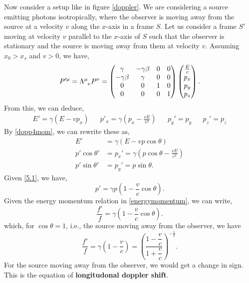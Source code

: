 \documentclass{book}
\begin{document}
Now consider a setup like in figure \ref{doppler}. We are considering a source emitting photons isotropically, where the observer is moving away from the source at a velocity $v$ along the $x$-axis in a frame $S$. Let us consider a frame $S'$ moving at velocity $v$ parallel to the $x$-axis of $S$ such that the observer is stationary and the source is moving away from them at velocity $v$. Assuming $x_0 > x_s$ and $v>0$, we have,
\begin{equation}
	P'^{\mu} = \Lambda\indices{^\mu_\nu}P^{\nu} = \begin{pmatrix}
		\gamma & -\gamma\beta & 0 & 0 \\
		-\gamma\beta & \gamma & 0 & 0 \\
		0 & 0 & 1 & 0 \\
		0 & 0 & 0 & 1
	\end{pmatrix}\begin{pmatrix}
	\frac{E}{c} \\ p_x \\ p_y \\ p_z
	\end{pmatrix}.
\end{equation}
From this, we can deduce,
\begin{align}
	E' = \gamma\left(E - vp_x\right) && p'_x = \gamma\left(p_x - \frac{vE}{c^2}\right) && p_y' =p_y && p_z' = p_z
\end{align}
By \eqref{dopp4mom}, we can rewrite these as,
\begin{align}
	E' & = \gamma\left(E - vp\cos\theta\right) \label{5.1}\\
	p'\cos\theta' & = p_x' = \gamma(p\cos\theta - \frac{vE}{c^2}) \\
	p'\sin\theta' & = p_y' = p\sin\theta.
\end{align}
Given \eqref{5.1}, we have,
\begin{equation}
	p' = \gamma p (1-\frac{v}{c}\cos\theta). \label{almostdopp}
\end{equation}
Given the energy momentum relation in \eqref{energymomentum}, we can write,
\begin{equation}
	\frac{f'}{f} = \gamma\left(1 - \frac{v}{c}\cos\theta\right).
\end{equation}
which, for $\cos\theta = 1$, i.e., the source moving away from the observer, we have
\begin{equation}
	\frac{f'}{f} = \gamma\left(1 - \frac{v}{c}\right) = \left(\frac{1 - \dfrac{v}{c}}{1 + \dfrac{v}{c}}\right)^{-\frac{1}{2}}.
\end{equation}
For the source moving away from the observer, we would get a change in sign.
This is the equation of \textbf{longitudonal doppler shift}.
\end{document}

